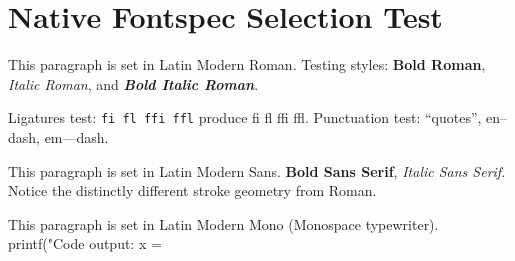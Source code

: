 \documentclass{article}
\begin{document}
\section{\sffamily Native Fontspec Selection Test}

This paragraph is set in Latin Modern Roman.
Testing styles: \textbf{Bold Roman}, \textit{Italic Roman}, and \textbf{\textit{Bold Italic Roman}}.

Ligatures test: \verb|fi fl ffi ffl| produce fi fl ffi ffl.
Punctuation test: ``quotes'', en--dash, em---dash.

\bigskip
{\sffamily
This paragraph is set in Latin Modern Sans.
\textbf{Bold Sans Serif}, \textit{Italic Sans Serif}.
Notice the distinctly different stroke geometry from Roman.
}

\bigskip
{\ttfamily
This paragraph is set in Latin Modern Mono (Monospace typewriter).
printf("Code output: x = %
}
\end{document}
